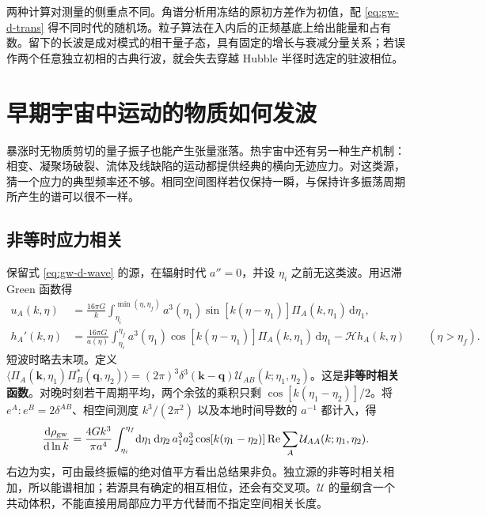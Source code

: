 两种计算对测量的侧重点不同。角谱分析用冻结的原初方差作为初值，配 \eqref{eq:gw-d-trans} 得不同时代的随机场。粒子算法在入内后的正频基底上给出能量和占有数。留下的长波是成对模式的相干量子态，具有固定的增长与衰减分量关系；若误作两个任意独立初相的古典行波，就会失去穿越 Hubble 半径时选定的驻波相位。

\section{早期宇宙中运动的物质如何发波}\label{sec:gw-dsource}

暴涨时无物质剪切的量子振子也能产生张量涨落。热宇宙中还有另一种生产机制：相变、凝聚场破裂、流体及线缺陷的运动都提供经典的横向无迹应力。对这类源，猜一个应力的典型频率还不够。相同空间图样若仅保持一瞬，与保持许多振荡周期所产生的谱可以很不一样。

\subsection{非等时应力相关}

保留式 \eqref{eq:gw-d-wave} 的源，在辐射时代 $a''=0$，并设 $\eta_i$ 之前无这类波。用迟滞 Green 函数得
\begin{align}
 u_A(k,\eta)&=\frac{16\pi G}{k}\int_{\eta_i}^{\min(\eta,\eta_f)}
 a^3(\eta_1)\sin[k(\eta-\eta_1)]\Pi_A(k,\eta_1)\,\mathrm d\eta_1,\nonumber\\
 h_A'(k,\eta)&=\frac{16\pi G}{a(\eta)}
 \int_{\eta_i}^{\eta_f} a^3(\eta_1)\cos[k(\eta-\eta_1)]
 \Pi_A(k,\eta_1)\,\mathrm d\eta_1-\mathcal H h_A(k,\eta)
 \qquad (\eta>\eta_f). \label{eq:gw-d-sourcegreen}
\end{align}
短波时略去末项。定义 $\langle\Pi_A(\bm k,\eta_1)\Pi_B^*(\bm q,\eta_2)\rangle=(2\pi)^3\delta^3(\bm k-\bm q)\mathcal U_{AB}(k;\eta_1,\eta_2)$。这是\textbf{非等时相关函数}。对晚时刻若干周期平均，两个余弦的乘积只剩 $\cos[k(\eta_1-\eta_2)]/2$。将 $e^A:e^B=2\delta^{AB}$、相空间测度 $k^3/(2\pi^2)$ 以及本地时间导数的 $a^{-1}$ 都计入，得
\begin{equation}\label{eq:gw-d-uetc}
 \frac{\mathrm d\rho_{\rm gw}}{\mathrm d\ln k}
 =\frac{4G k^3}{\pi a^4}
 \int_{\eta_i}^{\eta_f}\!\mathrm d\eta_1\,\mathrm d\eta_2\,
 a_1^3a_2^3\cos[k(\eta_1-\eta_2)]
 \operatorname{Re}\sum_A\mathcal U_{AA}(k;\eta_1,\eta_2).
\end{equation}
右边为实，可由最终振幅的绝对值平方看出总结果非负。独立源的非等时相关相加，所以能谱相加；若源具有确定的相互相位，还会有交叉项。$\mathcal U$ 的量纲含一个共动体积，不能直接用局部应力平方代替而不指定空间相关长度。

